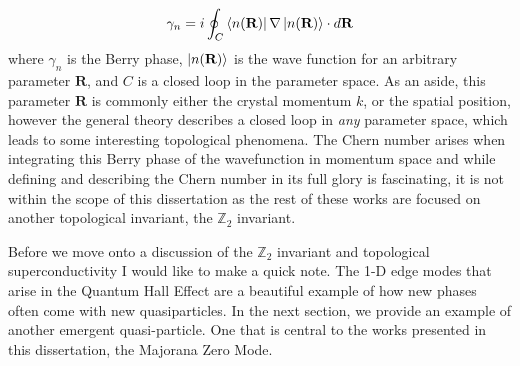 \begin{align}
	\gamma_{n} = i\oint_{C}\bra{n(\textbf{R})}\nabla\ket{n(\textbf{R})}\cdot d\textbf{R}
\end{align}
where $\gamma_{n}$ is the Berry phase, $\ket{n(\textbf{R})}$ is the wave function for an arbitrary parameter $\textbf{R}$, and $C$ is a closed loop in the parameter space. As an aside, this parameter $\textbf{R}$ is commonly either the crystal momentum $k$, or the spatial position, however the general theory describes a closed loop in \textit{any} parameter space, which leads to some interesting topological phenomena\cite{Onoda2002,Gobel2019}. The Chern number arises when integrating this Berry phase of the wavefunction in momentum space and while defining and describing the Chern number in its full glory is fascinating, it is not within the scope of this dissertation as the rest of these works are focused on another topological invariant, the $\mathbb{Z}_{2}$ invariant.\par 
Before we move onto a discussion of the $\mathbb{Z}_{2}$ invariant and topological superconductivity I would like to make a quick note. The 1-D edge modes that arise in the Quantum Hall Effect are a beautiful example of how new phases often come with new quasiparticles. In the next section, we provide an example of another emergent quasi-particle. One that is central to the works presented in this dissertation, the Majorana Zero Mode.
